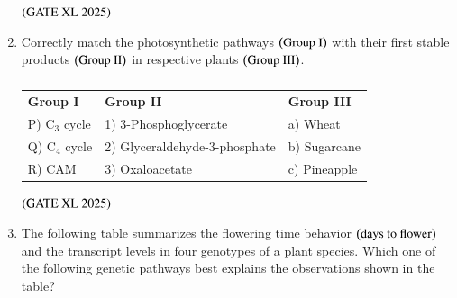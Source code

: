 \documentclass[journal]{IEEEtran}
\begin{document}
\begin{enumerate}
    \hfill $\left(\text{GATE XL 2025}\right)$
    \begin{enumerate}
    \end{enumerate}

    \item Correctly match the photosynthetic pathways $\left(\text{Group I}\right)$ with their first stable products $\left(\text{Group II}\right)$ in respective plants $\left(\text{Group III}\right)$.

    \begin{table}[H]
        \centering
        \begin{tabular}{lll}
            \textbf{Group I} & \textbf{Group II} & \textbf{Group III} \\
            P) C$_3$ cycle & 1) 3-Phosphoglycerate & a) Wheat \\
            Q) C$_4$ cycle & 2) Glyceraldehyde-3-phosphate & b) Sugarcane \\
            R) CAM         & 3) Oxaloacetate & c) Pineapple \\
        \end{tabular}
        \caption*{}
        \label{tab:xl2025_q57}
    \end{table}

    \hfill $\left(\text{GATE XL 2025}\right)$
    \begin{enumerate}
    \end{enumerate}

    \item The following table summarizes the flowering time behavior $\left(\text{days to flower}\right)$ and the transcript levels in four genotypes of a plant species. Which one of the following genetic pathways best explains the observations shown in the table?


\end{enumerate}
\end{document}
